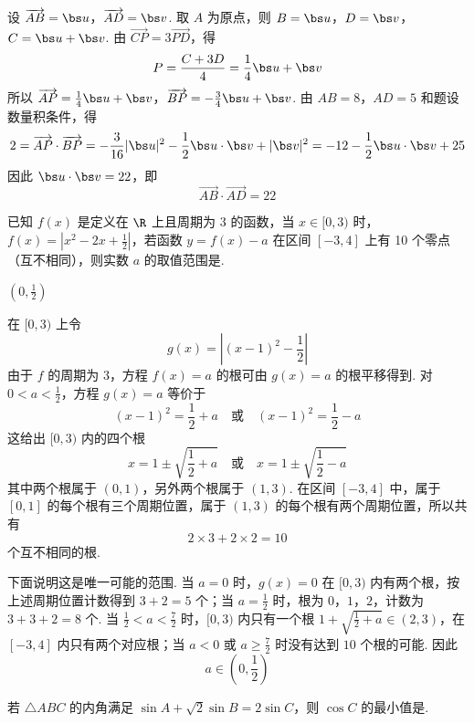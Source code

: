 \begin{solution}
设 \(\overrightarrow{AB}=\bs u\)，\(\overrightarrow{AD}=\bs v\). 取 \(A\) 为原点，则 \(B=\bs u\)，\(D=\bs v\)，\(C=\bs u+\bs v\). 由 \(\overrightarrow{CP}=3\overrightarrow{PD}\)，得
\[
P=\frac{C+3D}{4}=\frac14\bs u+\bs v
\]
所以 \(\overrightarrow{AP}=\frac14\bs u+\bs v\)，\(\overrightarrow{BP}=-\frac34\bs u+\bs v\).
由 \(AB=8\)，\(AD=5\) 和题设数量积条件，得
\[
2=\overrightarrow{AP}\cdot\overrightarrow{BP}
=-\frac3{16}|\bs u|^2-\frac12\bs u\cdot\bs v+|\bs v|^2
=-12-\frac12\bs u\cdot\bs v+25
\]
因此 \(\bs u\cdot\bs v=22\)，即
\[
\overrightarrow{AB}\cdot\overrightarrow{AD}=22
\]
\end{solution}

\begin{problem}
已知 \( f(x) \) 是定义在 \( \R \) 上且周期为 3 的函数，当 \( x \in [0,3) \) 时，\( f(x) = \left|x^2 - 2x + \frac{1}{2}\right| \)，若函数 \( y = f(x) - a \) 在区间 \([-3,4]\) 上有 10 个零点（互不相同），则实数 \( a \) 的取值范围是\fillinblank{}.
\end{problem}

\begin{answer}
\(\left(0,\frac{1}{2}\right)\)
\end{answer}

\begin{solution}
在 \([0,3)\) 上令
\[
g(x)=\left|(x-1)^2-\frac12\right|
\]
由于 \(f\) 的周期为 \(3\)，方程 \(f(x)=a\) 的根可由 \(g(x)=a\) 的根平移得到. 对 \(0<a<\frac12\)，方程 \(g(x)=a\) 等价于
\[
(x-1)^2=\frac12+a\quad\text{或}\quad (x-1)^2=\frac12-a
\]
这给出 \([0,3)\) 内的四个根
\[
x=1\pm\sqrt{\frac12+a}\quad\text{或}\quad x=1\pm\sqrt{\frac12-a}
\]
其中两个根属于 \((0,1)\)，另外两个根属于 \((1,3)\). 在区间 \([-3,4]\) 中，属于 \([0,1]\) 的每个根有三个周期位置，属于 \((1,3)\) 的每个根有两个周期位置，所以共有
\[
2\times3+2\times2=10
\]
个互不相同的根.

下面说明这是唯一可能的范围. 当 \(a=0\) 时，\(g(x)=0\) 在 \([0,3)\) 内有两个根，按上述周期位置计数得到 \(3+2=5\) 个；当 \(a=\frac12\) 时，根为 \(0\)，\(1\)，\(2\)，计数为 \(3+3+2=8\) 个. 当 \(\frac12<a<\frac72\) 时，\([0,3)\) 内只有一个根 \(1+\sqrt{\frac12+a}\in(2,3)\)，在 \([-3,4]\) 内只有两个对应根；当 \(a<0\) 或 \(a\geqslant\frac72\) 时没有达到 \(10\) 个根的可能. 因此
\[
a\in\left(0,\frac12\right)
\]
\end{solution}

\begin{problem}
若 \(\triangle ABC\) 的内角满足 \(\sin A + \sqrt{2}\sin B = 2\sin C\)，则 \(\cos C\) 的最小值是\fillinblank{}.
\end{problem}

